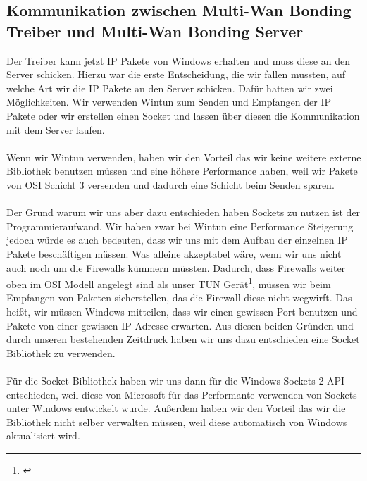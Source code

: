 \subsection{Kommunikation zwischen Multi-Wan Bonding Treiber und Multi-Wan Bonding Server}
Der Treiber kann jetzt IP Pakete von Windows erhalten und muss diese an den Server schicken. Hierzu war die erste Entscheidung, die wir fallen mussten, auf welche Art wir die IP Pakete an den Server schicken. Dafür hatten wir zwei Möglichkeiten. Wir verwenden Wintun zum Senden und Empfangen der IP Pakete oder wir erstellen einen Socket und lassen über diesen die Kommunikation mit dem Server laufen.
\\\\
Wenn wir Wintun verwenden, haben wir den Vorteil das wir keine weitere externe Bibliothek benutzen müssen und eine höhere Performance haben, weil wir Pakete von OSI Schicht 3 versenden und dadurch eine Schicht beim Senden sparen.
\\\\
Der Grund warum wir uns aber dazu entschieden haben Sockets zu nutzen ist der Programmieraufwand. Wir haben zwar bei Wintun eine Performance Steigerung jedoch würde es auch bedeuten, dass wir uns mit dem Aufbau der einzelnen IP Pakete beschäftigen müssen. Was alleine akzeptabel wäre, wenn wir uns nicht auch noch um die Firewalls kümmern müssten. Dadurch, dass Firewalls weiter oben im OSI Modell angelegt sind als unser TUN Gerät\footnote[1]{\cite[Vgl.][]{8}}, müssen wir beim Empfangen von Paketen sicherstellen, das die Firewall diese nicht wegwirft. Das heißt, wir müssen Windows mitteilen, dass wir einen gewissen Port benutzen und Pakete von einer gewissen IP-Adresse erwarten. Aus diesen beiden Gründen und durch unseren bestehenden Zeitdruck haben wir uns dazu entschieden eine Socket Bibliothek zu verwenden.
\\\\
Für die Socket Bibliothek haben wir uns dann für die Windows Sockets 2 API entschieden, weil diese von Microsoft für das Performante verwenden von Sockets unter Windows entwickelt wurde. Außerdem haben wir den Vorteil das wir die Bibliothek nicht selber verwalten müssen, weil diese automatisch von Windows aktualisiert wird.

